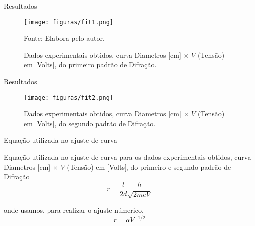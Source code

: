 \documentclass[aspectratio=169,12.5pt,xcolor=dvipsnames]{beamer}
\begin{document}
\begin{frame}{Resultados}

        \begin{center}
        \begin{figure}
        \caption{Dados experimentais obtidos, curva Diametros [cm] $\times$ $V$ (Tensão) em [Volts], do primeiro padrão de Difração.}
        \vspace*{-0.25cm}
        \texttt{[image: figuras/fit1.png]}\par
        {\scriptsize Fonte: Elabora pelo autor.}
        \end{figure}
        \end{center}
    
\end{frame}

\begin{frame}{Resultados}

        \begin{center}
        \begin{figure}
        \caption{Dados experimentais obtidos, curva Diametros [cm] $\times$ $V$ (Tensão) em [Volts], do segundo padrão de Difração.}
        \vspace*{-0.25cm}
        \texttt{[image: figuras/fit2.png]}\par
        \end{figure}
        \end{center}
    
\end{frame}

\begin{frame}{Equação utilizada no ajuste de curva}
    
    Equação utilizada no ajuste de curva para os dados experimentais obtidos, curva Diametros [cm] $\times$ $V$ (Tensão) em [Volts], do primeiro e segundo padrão de Difração
    \begin{equation}
    r = \frac{l}{2d} \frac{h}{\sqrt{2 m e V}}
    \end{equation}

    onde usamos, para realizar o ajuste númerico,
    \begin{equation}
    r = \alpha V^{-1/2}
    \end{equation}

\end{frame}
\end{document}
